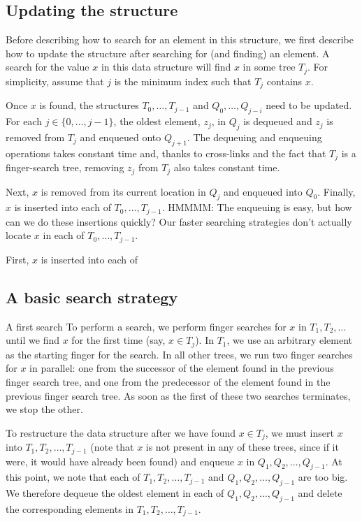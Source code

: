 \documentclass{llncs}
\begin{document}
\subsection{Updating the structure}

Before describing how to search for an element in this structure, we first describe how to update the structure after searching for (and finding) an element.  A search for the value $x$ in this data structure will find $x$ in some tree $T_j$.  For simplicity, assume that $j$ is the minimum index such that $T_j$ contains $x$.

Once $x$ is found, the structures $T_0,\ldots,T_{j-1}$ and $Q_0,\ldots,Q_{j-i}$ need to be updated.  For each $j\in\{0,\ldots,j-1\}$, the oldest element, $z_j$, in $Q_j$ is dequeued and $z_j$ is removed from $T_j$ and enqueued onto $Q_{j+1}$. The dequeuing and enqueuing operations takes constant time and, thanks to cross-links and the fact that $T_j$ is a finger-search tree, removing $z_j$ from $T_j$ also takes constant time. 

Next, $x$ is removed from its current location in $Q_j$ and enqueued
into $Q_0$. Finally, $x$ is inserted into each of $T_0,\ldots,T_{j-1}$.
HMMMM: The enqueuing is easy, but how can we do these insertions quickly?
Our faster searching strategies don't actually locate $x$ in each of
$T_0,\ldots,T_{j-1}$.

    First, $x$ is inserted into each of 

\subsection{A basic search strategy}

A first search
To perform a search, we perform finger searches for $x$ in $T_1,T_2,\ldots$ until we find $x$ for the first time (say, $x \in T_j$). In $T_1$, we use an arbitrary element as the starting finger for the search. In all other trees, we run two finger searches for $x$ in parallel: one from the successor of the element found in the previous finger search tree, and one from the predecessor of the element found in the previous finger search tree. As soon as the first of these two searches terminates, we stop the other. 

To restructure the data structure after we have found $x \in T_j$, we must insert $x$ into $T_1,T_2,\ldots,T_{j-1}$ (note that $x$ is not present in any of these trees, since if it were, it would have already been found) and enqueue $x$ in $Q_1,Q_2,\ldots,Q_{j-1}$. At this point, we note that each of $T_1,T_2,\ldots,T_{j-1}$ and $Q_1,Q_2,\ldots,Q_{j-1}$ are too big. We therefore dequeue the oldest element in each of $Q_1,Q_2,\ldots,Q_{j-1}$ and delete the corresponding elements in $T_1,T_2,\ldots,T_{j-1}$.
\end{document}
